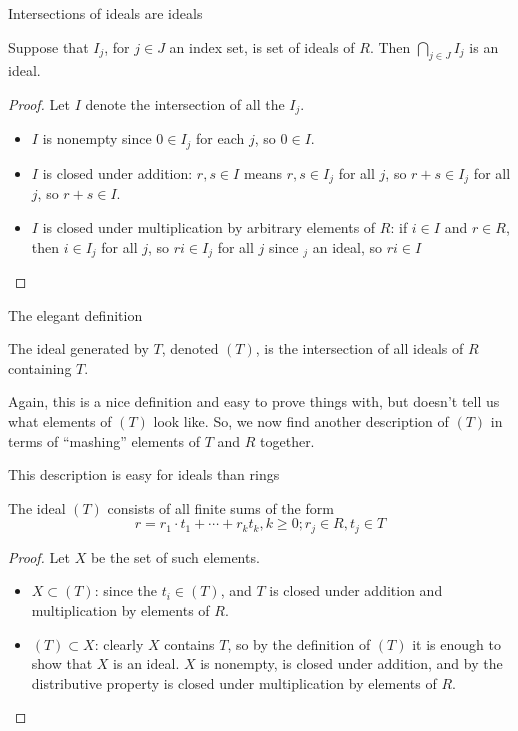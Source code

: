 \documentclass{beamer}
\begin{document}
\begin{frame}{Intersections of ideals are ideals}
\begin{lemma} Suppose that $I_j$, for $j\in J$ an index set, is set of ideals of $R$.  Then $\bigcap_{j\in J} I_j$ is an ideal.
\end{lemma}

\begin{proof} 
Let $I$ denote the intersection of all the $I_j$.
\begin{itemize} 
\item $I$ is nonempty since $0\in I_j$ for each $j$, so $0\in I$.
\item $I$ is closed under addition: $r,s\in I$ means $r,s \in I_j$ for all $j$, so $r+s\in I_j$ for all $j$, so $r+s\in I$.
\item $I$ is closed under multiplication by arbitrary elements of $R$: if $i\in I$ and $r\in R$, then $i\in I_j$ for all $j$, so $ri\in I_j$ for all $j$ since $_j$ an ideal, so $ri\in I$
\end{itemize}
\end{proof}


\end{frame}


\begin{frame}{The elegant definition}

\begin{definition}
The ideal generated by $T$, denoted $(T)$, is the intersection of all ideals of $R$ containing $T$.
\end{definition}

Again, this is a nice definition and easy to prove things with, but doesn't tell us what elements of $(T)$ look like.  So, we now find another description of $(T)$ in terms of ``mashing'' elements of $T$ and $R$ together.

\end{frame}


\begin{frame}{This description is easy for ideals than rings}


\begin{lemma}
The ideal $(T)$ consists of all finite sums of the form
$$r=r_1\cdot t_1+\cdots+r_kt_k, k\geq 0; r_j\in R, t_j\in T$$
\end{lemma}
\begin{proof}
Let $X$ be the set of such elements.  

\begin{itemize}
\item $X\subset (T)$: since the $t_i\in (T)$, and $T$ is closed under addition and multiplication by elements of $R$.
\item $(T)\subset X$: clearly $X$ contains $T$, so by the definition of $(T)$ it is enough to show that $X$ is an ideal.  $X$ is nonempty, is closed under addition, and by the distributive property is closed under multiplication by elements of $R$.
\end{itemize}
\end{proof}

\end{frame}
\end{document}
